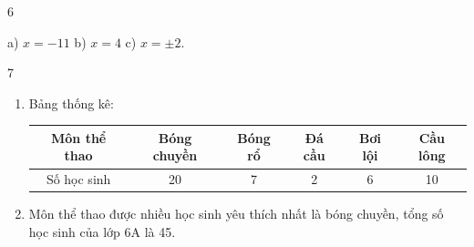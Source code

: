 \begin{Solbook}{6}
 \par \noindent a) $x=-11$ \hfill b) $x=4$ \hfill c) $x=\pm 2$.  \hfill \qedEX 
\end{Solbook}
\begin{Solbook}{7}
 \par \noindent  \begin {enumerate} \item Bảng thống kê:\\ \begin {tabular}{|c|c|c|c|c|c|} \hline Môn thể thao & Bóng chuyền &Bóng rổ& Đá cầu& Bơi lội& Cầu lông\\ \hline Số học sinh & 20 & 7 & 2 & 6&10 \\ \hline \end {tabular} \item Môn thể thao được nhiều học sinh yêu thích nhất là bóng chuyền, tổng số học sinh của lớp 6A là 45. \end {enumerate}  \hfill \qedEX 
\end{Solbook}
